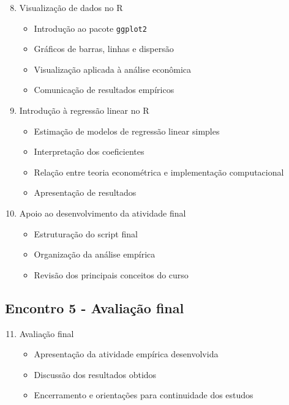 \documentclass[12pt,a4paper]{article}
\begin{document}
	\begin{enumerate}[label=\arabic*.]
		\setcounter{enumi}{7}
		
		\item Visualização de dados no R
		\begin{itemize}
			\item Introdução ao pacote \texttt{ggplot2}
			\item Gráficos de barras, linhas e dispersão
			\item Visualização aplicada à análise econômica
			\item Comunicação de resultados empíricos
		\end{itemize}
		
		\item Introdução à regressão linear no R
		\begin{itemize}
			\item Estimação de modelos de regressão linear simples
			\item Interpretação dos coeficientes
			\item Relação entre teoria econométrica e implementação computacional
			\item Apresentação de resultados
		\end{itemize}
		
		\item Apoio ao desenvolvimento da atividade final
		\begin{itemize}
			\item Estruturação do script final
			\item Organização da análise empírica
			\item Revisão dos principais conceitos do curso
		\end{itemize}
		
	\end{enumerate}
	
	\subsection*{Encontro 5 - Avaliação final}
	
	\begin{enumerate}[label=\arabic*.]
		\setcounter{enumi}{10}
		
		\item Avaliação final
		\begin{itemize}
			\item Apresentação da atividade empírica desenvolvida
			\item Discussão dos resultados obtidos
			\item Encerramento e orientações para continuidade dos estudos
		\end{itemize}
		
	\end{enumerate}
	
\end{document}
